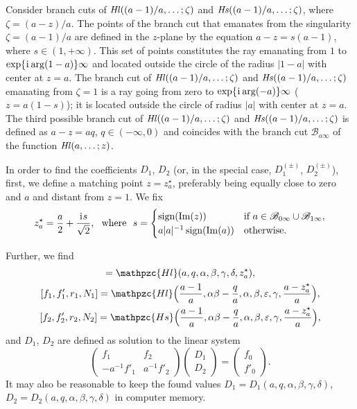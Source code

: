 \documentclass[11pt]{article}
\newcommand{\MF}[1]{\mathop{#1}\nolimits}
\newcommand{\ii}{\kern0.05em\mathrm{i}\kern0.05em} \newcommand{\E}[1]{\textrm{e}^{#1}}
\newcommand{\sign}{\mathop{\textrm{sign}}}
\newcommand{\BCzero}{\mathscr{B}_{0\infty}}%
\newcommand{\BCone}{\mathscr{B}_{1\infty}}%
\newcommand{\BCa}{\mathscr{B}_{a\infty}}
\def\HeunL{\MF{\textit{Hl\/}}}%
\def\HeunS{\MF{\textit{Hs\/}}}%
\def\psHeunLfin{\mathpzc{Hl}}%
\def\psHeunSfin{\mathpzc{Hs}}%
\def\midpoint#1{z^\star_{#1}}%
\begin{document}
Consider branch cuts of $\HeunL((a-1)/a,\ldots;\zeta)$ and
$\HeunS((a-1)/a,\ldots;\zeta)$, where $\zeta=(a-z)/a$. The points of the branch
cut that emanates from the singularity $\zeta=(a-1)/a$ are defined in the
$z$-plane by the equation $a-z=s(a-1)$, where $s\in(1,+\infty)$. This set of
points constitutes the ray emanating from $1$ to $\exp\{\ii\arg(1-a)\}\infty$
and located outside the circle of the radius $|1-a|$ with center at $z=a$. The
branch cut of $\HeunL((a-1)/a,\ldots;\zeta)$ and $\HeunS((a-1)/a,\ldots;\zeta)$
emanating from $\zeta=1$ is a ray going from zero to $\exp\{\ii\arg(-a)\}\infty$
($z=a(1-s)$); it is located outside the circle of radius $|a|$ with center at
$z=a$. The third possible branch cut of $\HeunL((a-1)/a,\ldots;\zeta)$ and
$\HeunS((a-1)/a,\ldots;\zeta)$ is defined as $a-z=aq$, $q\in(-\infty,0)$ and
coincides with the branch cut $\BCa$ of the function $\HeunL(a,\ldots;z)$.

In order to find the coefficients $D_1$, $D_2$ (or, in the special case,
$D^{(\pm)}_1$, $D^{(\pm)}_2$), first, we define a matching point
$z=\midpoint{a}$, preferably being equally close to zero and $a$ and distant
from $z=1$. We fix
\[
\midpoint{a} = \frac{a}{2} + \frac{\ii s}{\sqrt{2}},\ \ \mbox{where}\ \
s=\begin{cases}\sign(\Im(z)) & \textrm{if}\ a\in\BCzero\cup\BCone,\\
 a|a|^{-1}\sign(\Im(a)) &
\textrm{otherwise}.\end{cases}
\]

Further, we find
\begin{gather*}
 [f_0,f'_0,r_0,N_0]=\psHeunLfin(a,q,\alpha,\beta,\gamma,\delta,\midpoint{a}),\\
 [f_1,f'_1,r_1,N_1]=\psHeunLfin\Bigl(\frac{a-1}{a},\alpha\beta-\frac{q}{a},\alpha,\beta,
   \varepsilon,\gamma,\frac{a-\midpoint{a}}{a}\Bigr),\\
 [f_2,f'_2,r_2,N_2]=\psHeunSfin\Bigl(\frac{a-1}{a},\alpha\beta-\frac{q}{a},\alpha,\beta,
   \varepsilon,\gamma,\frac{a-\midpoint{a}}{a}\Bigr),
\end{gather*}
and $D_1$, $D_2$ are defined as solution to the linear system
\[
\left(\begin{matrix} f_1 & f_2\\ -a^{-1}f'_1 & a^{-1}f'_2
\end{matrix}\right)
\left(\begin{matrix} D_1\\D_2
\end{matrix}\right)=
\left(\begin{matrix} f_0\\f'_0
\end{matrix}\right).
\]
It may also be reasonable to keep the found values
$D_1=D_1(a,q,\alpha,\beta,\gamma,\delta)$,
$D_2=D_2(a,q,\alpha,\beta,\gamma,\delta)$ in computer memory.
\end{document}
